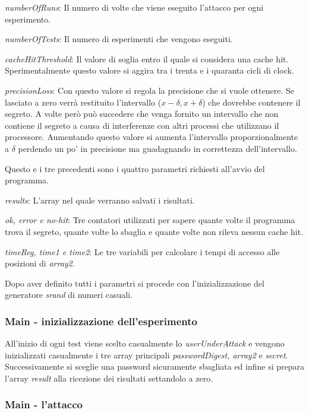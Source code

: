 					\emph{numberOfRuns}: Il numero di volte che viene eseguito l'attacco per ogni esperimento.
					
					\emph{numberOfTests}: Il numero di esperimenti che vengono eseguiti.
					
					\emph{cacheHitThreshold}: Il valore di soglia entro il quale si considera una cache hit. Sperimentalmente questo valore si aggira tra i trenta e i quaranta cicli di clock.
					
					\emph{precisionLoss}: Con questo valore si regola la precisione che si vuole ottenere. Se lasciato a zero verrà restituito l'intervallo ($x-\delta, x+\delta$) che dovrebbe contenere il segreto. A volte però può succedere che venga fornito un intervallo che non contiene il segreto a causa di interferenze con altri processi che utilizzano il processore. Aumentando questo valore si aumenta l'intervallo proporzionalmente a $\delta$ perdendo un po' in precisione ma guadagnando in correttezza dell'intervallo.
					
					Questo e i tre precedenti sono i quattro parametri richiesti all'avvio del programma.
					
					\emph{results}: L'array nel quale verranno salvati i risultati.
					
					\emph{ok, error e no-hit}: Tre contatori utilizzati per sapere quante volte il programma trova il segreto, quante volte lo sbaglia e quante volte non rileva nessun cache hit.
					
					\emph{timeReg, time1 e time2}: Le tre variabili per calcolare i tempi di accesso alle posizioni di \emph{array2}.
			
				Dopo aver definito tutti i parametri si procede con l'inizializzazione del generatore \emph{srand} di numeri casuali.
				
				\subsubsection{Main - inizializzazione dell'esperimento}
				
				All'inizio di ogni test viene scelto casualmente lo \emph{userUnderAttack} e vengono inizializzati casualmente i tre array principali \emph{passwordDigest, array2} e \emph{secret}. Successivamente si sceglie una password sicuramente sbagliata ed infine si prepara l'array \emph{result} alla ricezione dei risultati settandolo a zero.
				
				\subsubsection{Main - l'attacco}
				

